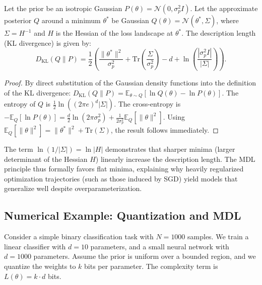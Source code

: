 \begin{lemma}
Let the prior be an isotropic Gaussian $P(\theta) = \mathcal{N}(0, \sigma_p^2 I)$. Let the approximate posterior $Q$ around a minimum $\theta^*$ be Gaussian $Q(\theta) = \mathcal{N}(\theta^*, \Sigma)$, where $\Sigma = H^{-1}$ and $H$ is the Hessian of the loss landscape at $\theta^*$. The description length (KL divergence) is given by:
\begin{equation}
    D_{\text{KL}}(Q \parallel P) = \frac{1}{2} \left( \frac{\|\theta^*\|^2}{\sigma_p^2} + \text{Tr}\left(\frac{\Sigma}{\sigma_p^2}\right) - d + \ln \left( \frac{| \sigma_p^2 I |}{|\Sigma|} \right) \right).
\end{equation}
\end{lemma}
\begin{proof}
By direct substitution of the Gaussian density functions into the definition of the KL divergence:
$D_{\text{KL}}(Q \parallel P) = \mathbb{E}_{\theta \sim Q}[\ln Q(\theta) - \ln P(\theta)]$. The entropy of $Q$ is $\frac{1}{2}\ln( (2\pi e)^d |\Sigma| )$. The cross-entropy is $-\mathbb{E}_Q[\ln P(\theta)] = \frac{d}{2}\ln(2\pi\sigma_p^2) + \frac{1}{2\sigma_p^2} \mathbb{E}_Q[\|\theta\|^2]$. Using $\mathbb{E}_Q[\|\theta\|^2] = \|\theta^*\|^2 + \text{Tr}(\Sigma)$, the result follows immediately.
\end{proof}

The term $\ln(1/|\Sigma|) = \ln |H|$ demonstrates that sharper minima (larger determinant of the Hessian $H$) linearly increase the description length. The MDL principle thus formally favors flat minima, explaining why heavily regularized optimization trajectories (such as those induced by SGD) yield models that generalize well despite overparameterization.

\subsection{Numerical Example: Quantization and MDL}

Consider a simple binary classification task with $N=1000$ samples. We train a linear classifier with $d=10$ parameters, and a small neural network with $d=1000$ parameters. 
Assume the prior is uniform over a bounded region, and we quantize the weights to $k$ bits per parameter. The complexity term is $L(\theta) = k \cdot d$ bits.

